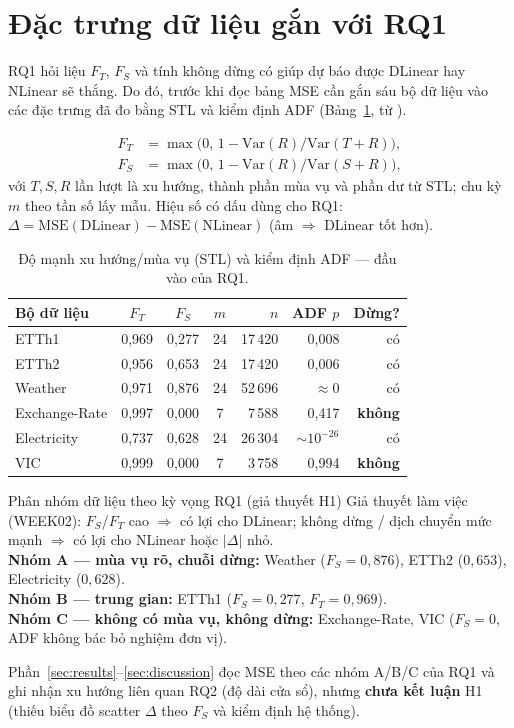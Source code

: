 \section{Đặc trưng dữ liệu gắn với RQ1}
\label{sec:profiles}

RQ1 hỏi liệu \(F_T\), \(F_S\) và tính không dừng có giúp dự báo được
DLinear hay NLinear sẽ thắng. Do đó, trước khi đọc bảng MSE cần gắn sáu bộ dữ liệu
vào các đặc trưng đã đo bằng STL \cite{cleveland1990stl,hyndman2021fpp3}
và kiểm định ADF (Bảng~\ref{tab:profiles}, từ ).

\begin{align*}
  F_T &= \max\!\bigl(0,\, 1 - \mathrm{Var}(R)/\mathrm{Var}(T+R)\bigr), \\
  F_S &= \max\!\bigl(0,\, 1 - \mathrm{Var}(R)/\mathrm{Var}(S+R)\bigr),
\end{align*}
với \(T,S,R\) lần lượt là xu hướng, thành phần mùa vụ và phần dư từ STL;
chu kỳ \(m\) theo tần số lấy mẫu.
Hiệu số có dấu dùng cho RQ1:
\(\Delta = \mathrm{MSE}(\mathrm{DLinear}) - \mathrm{MSE}(\mathrm{NLinear})\)
(âm \(\Rightarrow\) DLinear tốt hơn).

\begin{table}[H]
  \centering
  \caption{Độ mạnh xu hướng/mùa vụ (STL) và kiểm định ADF --- đầu vào của RQ1.}
  \label{tab:profiles}
  \small
  \begin{tabular}{@{}lcccrrr@{}}
    \toprule
    Bộ dữ liệu & \(F_T\) & \(F_S\) & \(m\) & \(n\) & ADF \(p\) & Dừng? \\
    \midrule
    ETTh1         & 0{,}969 & 0{,}277 & 24 & 17\,420 & 0{,}008 & có \\
    ETTh2         & 0{,}956 & 0{,}653 & 24 & 17\,420 & 0{,}006 & có \\
    Weather       & 0{,}971 & 0{,}876 & 24 & 52\,696 & \(\approx 0\) & có \\
    Exchange-Rate & 0{,}997 & 0{,}000 & 7  & 7\,588  & 0{,}417 & \textbf{không} \\
    Electricity   & 0{,}737 & 0{,}628 & 24 & 26\,304 & \(\sim 10^{-26}\) & có \\
    VIC           & 0{,}999 & 0{,}000 & 7  & 3\,758  & 0{,}994 & \textbf{không} \\
    \bottomrule
  \end{tabular}
\end{table}

\begin{examplebox}{Phân nhóm dữ liệu theo kỳ vọng RQ1 (giả thuyết H1)}
  Giả thuyết làm việc (WEEK02): \(F_S\)/\(F_T\) cao \(\Rightarrow\) có lợi cho DLinear;
  không dừng / dịch chuyển mức mạnh \(\Rightarrow\) có lợi cho NLinear hoặc \(\lvert\Delta\rvert\) nhỏ.\\[0.35em]
  \textbf{Nhóm A --- mùa vụ rõ, chuỗi dừng:} Weather (\(F_S{=}0{,}876\)), ETTh2 (\(0{,}653\)),
  Electricity (\(0{,}628\)).\\[0.2em]
  \textbf{Nhóm B --- trung gian:} ETTh1 (\(F_S{=}0{,}277\), \(F_T{=}0{,}969\)).\\[0.2em]
  \textbf{Nhóm C --- không có mùa vụ, không dừng:} Exchange-Rate, VIC
  (\(F_S{=}0\), ADF không bác bỏ nghiệm đơn vị).
\end{examplebox}

\noindent
Phần~\ref{sec:results}--\ref{sec:discussion} đọc MSE theo các nhóm A/B/C của RQ1
và ghi nhận xu hướng liên quan RQ2 (độ dài cửa sổ), nhưng
\textbf{chưa kết luận} H1 (thiếu biểu đồ scatter \(\Delta\) theo \(F_S\) và kiểm định hệ thống).
